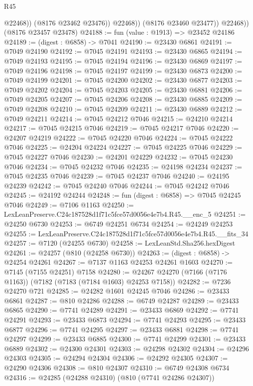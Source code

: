 \begin{lexlean}{R45}
\begin{coremodule}
{                    @22468))
                (@8176 @23462 @23476))
              @22468))
          (@8176 @23460 @23477))
        @22468))
    (@8176 @23457 @23478)
@24188 := fun (value : @1913) => @23452 @24186
@24189 := (digest : @6858) -> @7041
@24190 := @23430 @6861
@24191 := @7049 @24190
@24192 := @7045 @24191
@24193 := @23430 @6865
@24194 := @7049 @24193
@24195 := @7045 @24194
@24196 := @23430 @6869
@24197 := @7049 @24196
@24198 := @7045 @24197
@24199 := @23430 @6873
@24200 := @7049 @24199
@24201 := @7045 @24200
@24202 := @23430 @6877
@24203 := @7049 @24202
@24204 := @7045 @24203
@24205 := @23430 @6881
@24206 := @7049 @24205
@24207 := @7045 @24206
@24208 := @23430 @6885
@24209 := @7049 @24208
@24210 := @7045 @24209
@24211 := @23430 @6889
@24212 := @7049 @24211
@24214 := @7045 @24212 @7046
@24215 := @24210 @24214
@24217 := @7045 @24215 @7046
@24219 := @7045 @24217 @7046
@24220 := @24207 @24219
@24222 := @7045 @24220 @7046
@24224 := @7045 @24222 @7046
@24225 := @24204 @24224
@24227 := @7045 @24225 @7046
@24229 := @7045 @24227 @7046
@24230 := @24201 @24229
@24232 := @7045 @24230 @7046
@24234 := @7045 @24232 @7046
@24235 := @24198 @24234
@24237 := @7045 @24235 @7046
@24239 := @7045 @24237 @7046
@24240 := @24195 @24239
@24242 := @7045 @24240 @7046
@24244 := @7045 @24242 @7046
@24245 := @24192 @24244
@24248 := fun (digest : @6858) => @7045 @24245 @7046
@24249 := @7106 @1163
@24250 := LexLeanPreserve.C24c187528d1f71c5fce57d0056e4e7b4.R45.__enc_5
@24251 := @24250 @6730
@24253 := @6749 @24251 @6734
@24254 := @24249 @24253
@24255 := LexLeanPreserve.C24c187528d1f71c5fce57d0056e4e7b4.R45.__fits_34
@24257 := @7120 (@24255 @6730)
@24258 := LexLeanStd.Sha256.hexDigest
@24261 := @24257 (@810 (@24258 @6730))
@24263 := (digest : @6858) -> @24254 @24261
@24267 := @7137 @1163 @24253 @24261 @1603
@24270 := @7145 (@7155 @24251) @7158
@24280 := @24267 @24270 (@7166 (@7176 @1163)) (@7182 (@7183 (@7184 @1603) @24253 @7158))
@24282 := @7236 @24270 @721
@24285 := @24282 @1601 @24245 @7046
@24286 := @23433 @6861
@24287 := @810 @24286
@24288 := @6749 @24287
@24289 := @23433 @6865
@24290 := @7741 @24289
@24291 := @23433 @6869
@24292 := @7741 @24291
@24293 := @23433 @6873
@24294 := @7741 @24293
@24295 := @23433 @6877
@24296 := @7741 @24295
@24297 := @23433 @6881
@24298 := @7741 @24297
@24299 := @23433 @6885
@24300 := @7741 @24299
@24301 := @23433 @6889
@24302 := @24300 @24301
@24303 := @24298 @24302
@24304 := @24296 @24303
@24305 := @24294 @24304
@24306 := @24292 @24305
@24307 := @24290 @24306
@24308 := @810 @24307
@24310 := @6749 @24308 @6734
@24316 := @24285 (@24288 @24310) (@810 (@7741 @24286 @24307))
}
\end{coremodule}
\end{lexlean}
